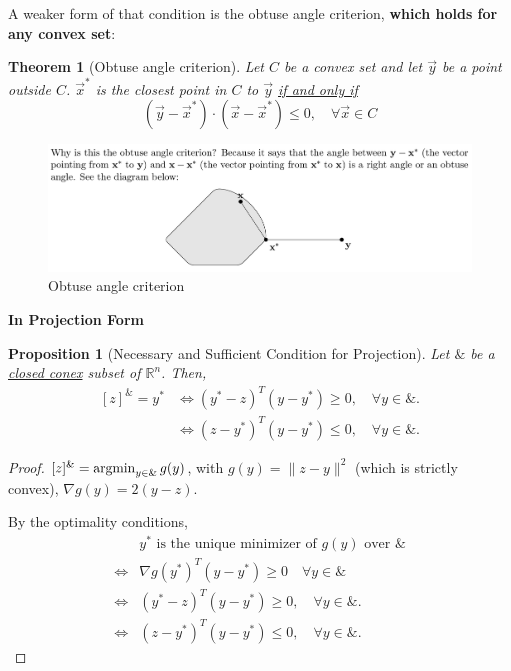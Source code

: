\documentclass[11pt,a4paper]{article}
\newcommand{\argmin}{\operatornamewithlimits{argmin}}
\newtheorem{theorem}{Theorem}
\newtheorem{proposition}{Proposition}
\begin{document}
A weaker form of that condition is the obtuse angle criterion, \textbf{which holds for any convex set}:
\begin{theorem}[Obtuse angle criterion]
    Let $C$ be a convex set and let $\vec{y}$ be a point outside $C$. $\vec{x}^*$ is the closest point in $C$ to $\vec{y}$ \underline{if and only if} $$(\vec{y}-\vec{x}^*)\cdot (\vec{x}-\vec{x}^*)\leq 0,\quad \forall \vec{x}\in C$$
\end{theorem}
\begin{center}\begin{figure}[htbp]
    \centering
    \includegraphics[scale=0.25]{obtuse.png}
    \caption{Obtuse angle criterion}
    \label{}
\end{figure}\end{center}
\textbf{In Projection Form}
\begin{proposition}
    [Necessary and Sufficient Condition for Projection]
    Let $\&$ be a \underline{closed conex} subset of $\mathbb{R}^n$. Then,
    \begin{equation}
        \begin{aligned}
            [z]^\&=y^*
            &\Leftrightarrow (y^*-z)^T(y-y^*)\geq 0,\quad \forall y\in\&.\\
            &\Leftrightarrow (z-y^*)^T(y-y^*)\leq 0,\quad \forall y\in\&.
        \end{aligned}
        \nonumber
    \end{equation}
\end{proposition}
\begin{proof}
    $[z]^\& = \argmin_{y\in\&}g(y)$, with $g(y)=\|z-y\|^2$ (which is strictly convex), $\nabla g(y)=2(y-z)$.

    By the optimality conditions,
    \begin{equation}
        \begin{aligned}
            &y^*\text{ is the unique minimizer of $g(y)$ over $\&$}\\
            \Leftrightarrow	& \nabla g(y^*)^T(y-y^*)\geq 0\quad \forall y\in\&\\
            \Leftrightarrow & (y^*-z)^T(y-y^*)\geq 0,\quad \forall y\in\&.\\
            \Leftrightarrow &(z-y^*)^T(y-y^*)\leq 0,\quad \forall y\in\&.
        \end{aligned}
        \nonumber
    \end{equation}
\end{proof}
\end{document}

